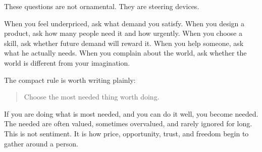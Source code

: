 These questions are not ornamental. They are steering devices.

When you feel underpriced, ask what demand you satisfy. When you design a product, ask how many people need it and how urgently. When you choose a skill, ask whether future demand will reward it. When you help someone, ask what he actually needs. When you complain about the world, ask whether the world is different from your imagination.

The compact rule is worth writing plainly:

\begin{quote}
Choose the most needed thing worth doing.
\end{quote}

If you are doing what is most needed, and you can do it well, you become needed. The needed are often valued, sometimes overvalued, and rarely ignored for long. This is not sentiment. It is how price, opportunity, trust, and freedom begin to gather around a person.
